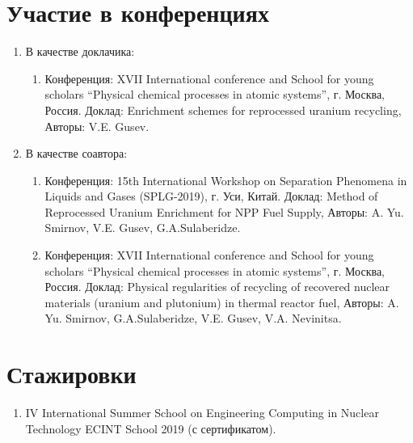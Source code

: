 \section{Участие в конференциях}
\begin{enumerate}
    \item В качестве доклачика:
    \begin{enumerate}
        \item Конференция:  XVII International conference and School for young scholars “Physical chemical processes in atomic systems”, г. Москва, Россия. Доклад: Enrichment schemes for reprocessed uranium recycling, Авторы: V.E. Gusev.
    \end{enumerate}
    \item В качестве соавтора:
    \begin{enumerate}
        \item Конференция:  15th International Workshop on Separation Phenomena in Liquids and Gases (SPLG-2019), г. Уси, Китай. Доклад: Method of Reprocessed Uranium Enrichment for NPP Fuel Supply, Авторы: A. Yu. Smirnov, V.E. Gusev, G.A.Sulaberidze.
        \item Конференция:  XVII International conference and School for young scholars “Physical chemical processes in atomic systems”, г. Москва, Россия. Доклад: Physical regularities of recycling of recovered nuclear materials (uranium         and plutonium) in thermal reactor fuel, Авторы: A. Yu. Smirnov, G.A.Sulaberidze, V.E. Gusev, V.A. Nevinitsa.
    \end{enumerate}
\end{enumerate}

\section{Стажировки}
    \begin{enumerate}
        \item IV International Summer School on Engineering Computing in Nuclear Technology ECINT School 2019 (с сертификатом).
    \end{enumerate}
